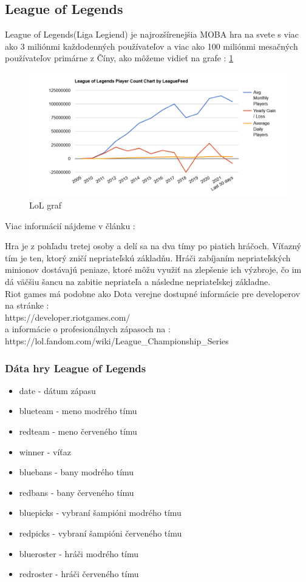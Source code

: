 \subsection{League of Legends}
League of Legends(Liga Legiend) je najrozšírenejšia MOBA hra na svete s viac ako 3 miliónmi každodenných používateľov a viac ako 100 miliónmi mesačných používateľov primárne z Číny, ako môžeme vidieť na grafe : \ref{leaguegraph} 

 \begin{figure}[h!]
	
	\includegraphics[width=.9\textwidth]{figures/leaguegraph}
	\centering
	\caption{ LoL graf  \label{leaguegraph}}
	
\end{figure}

Viac informácií nájdeme v článku :\cite{leaguefeed} 

Hra je z pohľadu tretej osoby a delí sa na dva tímy po piatich hráčoch. Víťazný tím je ten, ktorý zničí nepriateľskú základňu. Hráči zabíjaním nepriateľských minionov dostávajú peniaze, ktoré môžu využiť na zlepšenie ich výzbroje, čo im dá väčšiu šancu na zabitie nepriateľa a následne nepriateľskej základne.
\\ 
Riot games má podobne ako Dota verejne dostupné informácie pre developerov na stránke : 
\\ 
https://developer.riotgames.com/  
\\
a informácie o profesionálnych zápasoch na :
\\
https://lol.fandom.com/wiki/League\_Championship\_Series

\subsubsection{Dáta hry League of Legends}
\begin{itemize}
\item date - dátum zápasu 
\item blueteam - meno modrého tímu 
\item redteam - meno červeného tímu 
\item winner - víťaz 
\item bluebans - bany modrého tímu 
\item redbans - bany červeného tímu 
\item bluepicks - vybraní šampióni modrého tímu 
\item redpicks - vybraní šampióni červeného tímu 
\item blueroster - hráči modrého tímu 
\item redroster - hráči červeného tímu 
\end{itemize}
